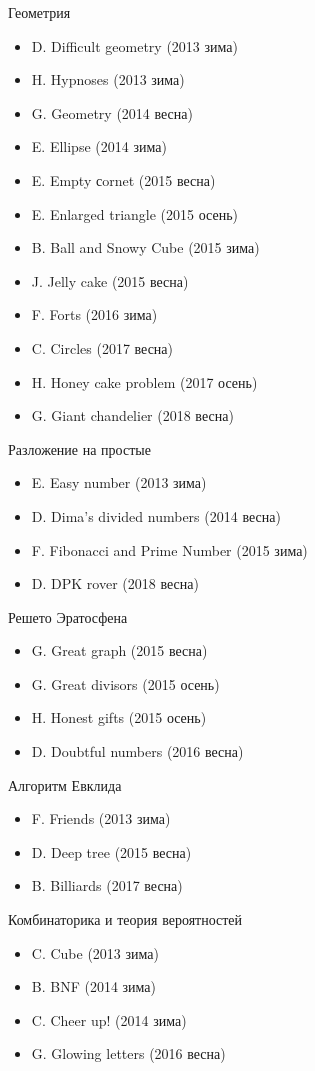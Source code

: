 Геометрия
\begin{itemize}
\item D. Difficult geometry (2013 зима)
\item H. Hypnoses (2013 зима)
\item G. Geometry (2014 весна)
\item E. Ellipse (2014 зима)
\item E. Empty сornet (2015 весна)
\item E. Enlarged triangle (2015 осень)
\item B. Ball and Snowy Cube (2015 зима)
\item J. Jelly cake (2015 весна)
\item F. Forts (2016 зима)
\item C. Circles (2017 весна)
\item H. Honey cake problem (2017 осень)
\item G. Giant chandelier (2018 весна)
\end{itemize}

Разложение на простые
\begin{itemize}
\item E. Easy number (2013 зима)
\item D. Dima’s divided numbers (2014 весна)
\item F. Fibonacci and Prime Number (2015 зима)
\item D. DPK rover (2018 весна)
\end{itemize}

Решето Эратосфена
\begin{itemize}
\item G. Great graph (2015 весна)
\item G. Great divisors (2015 осень)
\item H. Honest gifts (2015 осень)
\item D. Doubtful numbers (2016 весна)
\end{itemize}

Алгоритм Евклида
\begin{itemize}
\item F. Friends (2013 зима)
\item D. Deep tree (2015 весна)
\item B. Billiards (2017 весна)
\end{itemize}

Комбинаторика и теория вероятностей
\begin{itemize}
\item C. Cube (2013 зима)
\item B. BNF (2014 зима)
\item C. Cheer up! (2014 зима)
\item G. Glowing letters (2016 весна)
\end{itemize}

